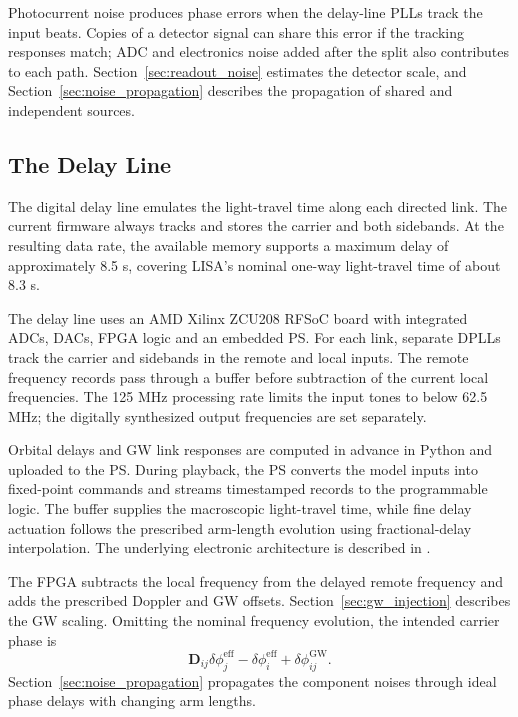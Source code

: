 \documentclass[aps,twocolumn,10pt,nofootinbib,floatfix]{revtex4-2}
\begin{document}
Photocurrent noise produces phase errors when the delay-line PLLs track the input beats. Copies of a detector signal can share this error if the tracking responses match; ADC and electronics noise added after the split also contributes to each path. Section~\ref{sec:readout_noise} estimates the detector scale, and Section~\ref{sec:noise_propagation} describes the propagation of shared and independent sources.

\subsection{The Delay Line}
\label{sec:delay_line}
The digital delay line emulates the light-travel time along each directed link. The current firmware always tracks and stores the carrier and both sidebands. At the resulting data rate, the available memory supports a maximum delay of approximately 8.5 s, covering LISA's nominal one-way light-travel time of about 8.3 s.

The delay line uses an AMD Xilinx ZCU208 RFSoC board with integrated ADCs, DACs, FPGA logic and an embedded \ac{PS}. For each link, separate DPLLs track the carrier and sidebands in the remote and local inputs. The remote frequency records pass through a buffer before subtraction of the current local frequencies. The 125 MHz processing rate limits the input tones to below 62.5 MHz; the digitally synthesized output frequencies are set separately.

Orbital delays and GW link responses are computed in advance in Python and uploaded to the \ac{PS}. During playback, the \ac{PS} converts the model inputs into fixed-point commands and streams timestamped records to the programmable logic.
The buffer supplies the macroscopic light-travel time, while fine delay actuation follows the prescribed arm-length evolution using fractional-delay interpolation. The underlying electronic architecture is described in \cite{ferguson2025applying}.

The FPGA subtracts the local frequency from the delayed remote frequency and adds the prescribed Doppler and GW offsets. Section~\ref{sec:gw_injection} describes the GW scaling. Omitting the nominal frequency evolution, the intended carrier phase is
\begin{equation*}
    \mathbf D_{ij}\delta\phi_j^{\mathrm{eff}}
    -\delta\phi_i^{\mathrm{eff}}+\delta\phi^{\mathrm{GW}}_{ij}.
\end{equation*}
Section~\ref{sec:noise_propagation} propagates the component noises through ideal phase delays with changing arm lengths.
\end{document}
